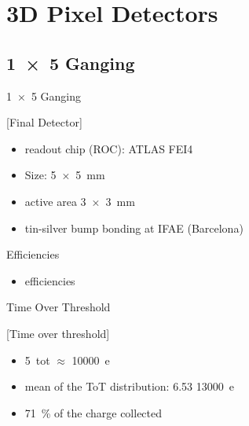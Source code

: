 \section{3D Pixel Detectors}
\subsection{\SI{1x5}{} Ganging}
\begin{frame}{\SI{1x5}{} Ganging}

	[Final Detector]	
	
	\begin{itemize}\itemfill
		\item readout chip (ROC): ATLAS FEI4
		\item Size: \SI{5x5}{\milli\meter}
		\item active area \SI{3x3}{\milli\meter}
		\item tin-silver bump bonding at IFAE (Barcelona)
	\end{itemize}
	
\end{frame}
\begin{frame}{Efficiencies}

	
	\begin{itemize}\itemfill
		\item efficiencies
	\end{itemize}
	
\end{frame}
\begin{frame}{Time Over Threshold}

	[Time over threshold]	
	
	\begin{itemize}\itemfill
		\item \SI{5}{tot} $\approx$ \SI{10000}{e}
		\item mean of the ToT distribution: 6.53 \ra \SI{13000}{e}
		\item \SI{71}{\%} of the charge collected
	\end{itemize}
	
\end{frame}
